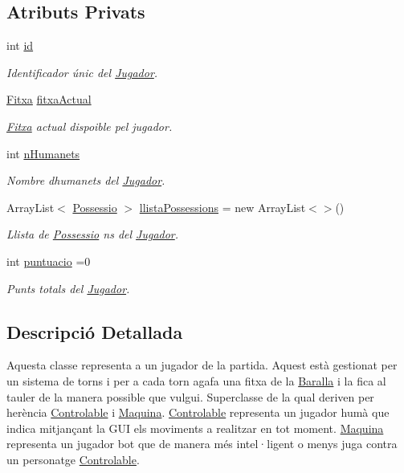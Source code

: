 \subsection*{Atributs Privats}
\begin{DoxyCompactItemize}
\item 
int \mbox{\hyperlink{class_jugador_aa400235b2aead9a7794fcca3c74f3a1b}{id}}
\begin{DoxyCompactList}\small\item\em Identificador únic del \mbox{\hyperlink{class_jugador}{Jugador}}. \end{DoxyCompactList}\item 
\mbox{\hyperlink{class_fitxa}{Fitxa}} \mbox{\hyperlink{class_jugador_a221c891bd7f14049abe513c2705ac5bc}{fitxa\+Actual}}
\begin{DoxyCompactList}\small\item\em \mbox{\hyperlink{class_fitxa}{Fitxa}} actual dispoible pel jugador. \end{DoxyCompactList}\item 
int \mbox{\hyperlink{class_jugador_a4ea2472182548451fce5be41eec23a46}{n\+Humanets}}
\begin{DoxyCompactList}\small\item\em Nombre d\textquotesingle{}humanets del \mbox{\hyperlink{class_jugador}{Jugador}}. \end{DoxyCompactList}\item 
Array\+List$<$ \mbox{\hyperlink{class_possessio}{Possessio}} $>$ \mbox{\hyperlink{class_jugador_aeae26acfb52e206e3fad8e30aca285b8}{llista\+Possessions}} = new Array\+List$<$$>$()
\begin{DoxyCompactList}\small\item\em Llista de \mbox{\hyperlink{class_possessio}{Possessio}} ns del \mbox{\hyperlink{class_jugador}{Jugador}}. \end{DoxyCompactList}\item 
int \mbox{\hyperlink{class_jugador_a08c2ed45358b666b8c41f93f86fc30ad}{puntuacio}} =0
\begin{DoxyCompactList}\small\item\em Punts totals del \mbox{\hyperlink{class_jugador}{Jugador}}. \end{DoxyCompactList}\end{DoxyCompactItemize}


\subsection{Descripció Detallada}
Aquesta classe representa a un jugador de la partida. Aquest està gestionat per un sistema de torns i per a cada torn agafa una fitxa de la \mbox{\hyperlink{class_baralla}{Baralla}} i la fica al tauler de la manera possible que vulgui. Superclasse de la qual deriven per herència \mbox{\hyperlink{class_controlable}{Controlable}} i \mbox{\hyperlink{class_maquina}{Maquina}}. \mbox{\hyperlink{class_controlable}{Controlable}} representa un jugador humà que indica mitjançant la G\+UI els moviments a realitzar en tot moment. \mbox{\hyperlink{class_maquina}{Maquina}} representa un jugador bot que de manera més intel·ligent o menys juga contra un personatge \mbox{\hyperlink{class_controlable}{Controlable}}. 

